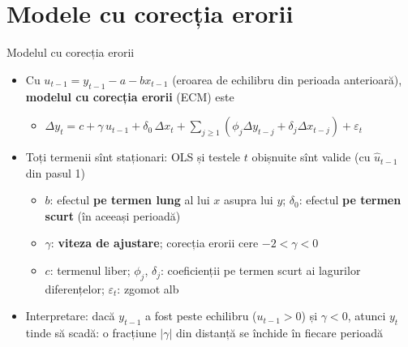 \section{Modele cu corecția erorii}

\begin{frame}{Modelul cu corecția erorii}
\itemsize{\small}
\begin{itemize}
    \item Cu $u_{t-1} = y_{t-1} - a - b x_{t-1}$ (eroarea de echilibru din perioada anterioară), \textbf{modelul cu corecția erorii} (ECM) este
    \begin{itemize}
        \item $\Delta y_t = c + \gamma\,u_{t-1} + \delta_0\,\Delta x_t + \sum_{j \ge 1}(\phi_j\Delta y_{t-j} + \delta_j\Delta x_{t-j}) + \varepsilon_t$
    \end{itemize}
    \item Toți termenii sînt staționari: OLS și testele $t$ obișnuite sînt valide (cu $\hat u_{t-1}$ din pasul 1)
    \begin{itemize}
        \item $b$: efectul \textbf{pe termen lung} al lui $x$ asupra lui $y$; $\delta_0$: efectul \textbf{pe termen scurt} (în aceeași perioadă)
        \item $\gamma$: \textbf{viteza de ajustare}; corecția erorii cere $-2 < \gamma < 0$
        \item $c$: termenul liber; $\phi_j$, $\delta_j$: coeficienții pe termen scurt ai lagurilor diferențelor; $\varepsilon_t$: zgomot alb
    \end{itemize}
    \item Interpretare: dacă $y_{t-1}$ a fost peste echilibru ($u_{t-1} > 0$) și $\gamma < 0$, atunci $y_t$ tinde să scadă: o fracțiune $|\gamma|$ din distanță se închide în fiecare perioadă
\end{itemize}
\end{frame}

